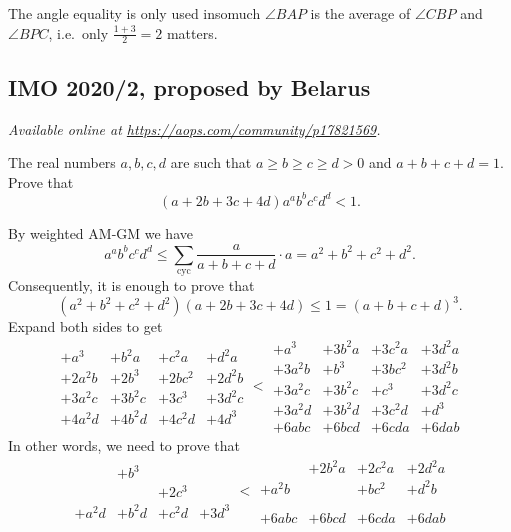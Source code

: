 \documentclass[11pt]{scrartcl}
\begin{document}
\begin{remark*}
  The angle equality is only used insomuch $\angle BAP$
  is the average of $\angle CBP$ and $\angle BPC$,
  i.e.\ only $\frac{1+3}{2} = 2$ matters.
\end{remark*}
\pagebreak

\subsection{IMO 2020/2, proposed by Belarus}
\textsl{Available online at \url{https://aops.com/community/p17821569}.}
\begin{mdframed}[style=mdpurplebox,frametitle={Problem statement}]
The real numbers $a, b, c, d$
are such that $a\geq b\geq c\geq d>0$ and $a+b+c+d=1$.
Prove that
\[ (a+2b+3c+4d) a^a b^b c^c d^d < 1. \]
\end{mdframed}
By weighted AM-GM we have
\[ a^a b^b c^c d^d \le \sum_{\text{cyc}} \frac{a}{a+b+c+d} \cdot a
  = a^2+b^2+c^2+d^2. \]
Consequently, it is enough to prove that
\[ (a^2+b^2+c^2+d^2)(a+2b+3c+4d) \le 1 = (a+b+c+d)^3. \]
Expand both sides to get
\[
  \begin{array}{cccc}
    +a^3 &+ b^2a &+ c^2a & +d^2a \\
    +2a^2b &+ 2b^3 &+ 2bc^2  & +2d^2b \\
    +3a^2c & + 3b^2c & + 3c^3 & + 3d^2c \\
    +4a^2d &+ 4b^2d & + 4c^2d & + 4d^3
  \end{array}
  <
  \begin{array}{cccc}
    +a^3 &+ 3b^2a &+ 3c^2a & +3d^2a \\
    +3a^2b &+ b^3 &+ 3bc^2  & +3d^2b \\
    +3a^2c &+ 3b^2c &+ c^3 &+ 3d^2c \\
    +3a^2d &+ 3b^2d &+ 3c^2d &+ d^3 \\
    +6abc &+ 6bcd &+ 6cda &+ 6dab
  \end{array}
\]
In other words, we need to prove that
\[
  \begin{array}{cccc}
    & && \\
    &+ b^3 & & \\
    & & +2c^3 & \\
    +a^2d &+ b^2d & + c^2d & + 3d^3 \\
  \end{array}
  <
  \begin{array}{cccc}
    &+ 2b^2a &+ 2c^2a & +2d^2a \\
    +a^2b & &+ bc^2  & +d^2b \\
    &&& \\
    &&& \\
    +6abc &+ 6bcd &+ 6cda &+ 6dab
  \end{array}
\]
\end{document}
